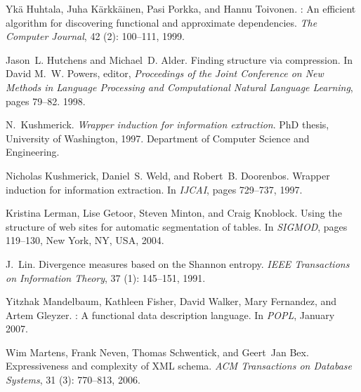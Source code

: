 \documentclass[natbib]{sigplanconf}
\begin{document}
\begin{thebibliography}{37}
Yk{\"a} Huhtala, Juha K{\"a}rkk{\"a}inen, Pasi Porkka, and Hannu Toivonen.
: An efficient algorithm for discovering functional and
  approximate dependencies.
\newblock \emph{The Computer Journal}, 42 (2): 100--111,
  1999.

Jason~L. Hutchens and Michael~D. Alder.
\newblock Finding structure via compression.
\newblock In David M.~W. Powers, editor, \emph{Proceedings of the Joint
  Conference on New Methods in Language Processing and Computational Natural
  Language Learning}, pages 79--82. 1998.

N.~Kushmerick.
\newblock \emph{Wrapper induction for information extraction}.
\newblock PhD thesis, University of Washington, 1997.
\newblock Department of Computer Science and Engineering.

Nicholas Kushmerick, Daniel~S. Weld, and Robert~B. Doorenbos.
\newblock Wrapper induction for information extraction.
\newblock In \emph{{IJCAI}}, pages 729--737, 1997.

Kristina Lerman, Lise Getoor, Steven Minton, and Craig Knoblock.
\newblock Using the structure of web sites for automatic segmentation of
  tables.
\newblock In \emph{{SIGMOD}}, pages 119--130, New York, NY, USA, 2004.

J.~Lin.
\newblock Divergence measures based on the {Shannon} entropy.
\newblock \emph{IEEE Transactions on Information Theory}, 37
  (1): 145--151, 1991.

Yitzhak Mandelbaum, Kathleen Fisher, David Walker, Mary Fernandez, and Artem
  Gleyzer.
: {A} functional data description language.
\newblock In \emph{{POPL}}, January 2007.

Wim Martens, Frank Neven, Thomas Schwentick, and Geert~Jan Bex.
\newblock Expressiveness and complexity of {XML} schema.
\newblock \emph{ACM Transactions on Database Systems}, 31
  (3): 770--813, 2006.


\end{thebibliography}
\end{document}
